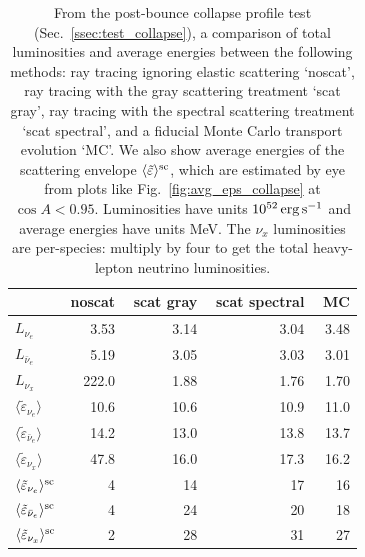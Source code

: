 \documentclass[aps,floatfix,prd,superscriptaddress,twocolumn]{revtex4-1}
\begin{document}
\begin{table}%
  \caption{
    From the post-bounce collapse profile test (Sec.~\ref{ssec:test_collapse}),
    a comparison of total luminosities and average energies between
    the following methods:
    ray tracing ignoring elastic scattering `noscat',
    ray tracing with the gray scattering treatment `scat gray',
    ray tracing with the spectral scattering treatment `scat spectral', and
    a fiducial Monte Carlo transport evolution `MC'.
    We also show average energies of the scattering envelope
    $\langle\tilde{\varepsilon}\rangle^{\rm sc}$, which are estimated by eye
    from plots like Fig.~\ref{fig:avg_eps_collapse} at $\cos A < 0.95$.
    Luminosities have units $10^{52}\,{\rm erg}\,{\rm s}^{-1}$ and
    average energies have units MeV.
    The $\nu_x$ luminosities are per-species:
    multiply by four to get the total heavy-lepton neutrino luminosities.
  }
  \label{tab:collapse_rt_vs_mc}
  \begin{tabularx}{\columnwidth}{X r r r r}
    & {\bf noscat} & \,\,{\bf scat gray} & \,\,{\bf scat spectral} & \,\,{\bf MC} \\
    \hline
    $L_{\nu_e}$                                         &  3.53 & 3.14 & 3.04 & 3.48 \\
    $L_{\bar{\nu}_e}$                                   & 5.19 & 3.05 & 3.03 & 3.01 \\
    $L_{\nu_x}$                                         & 222.0  & 1.88 & 1.76 & 1.70 \\
    $\langle \tilde{\varepsilon}_{\nu_e} \rangle$               &  10.6 & 10.6 & 10.9 & 11.0 \\
    $\langle \tilde{\varepsilon}_{\bar{\nu}_e} \rangle$         & 14.2 & 13.0 & 13.8 & 13.7 \\
    $\langle \tilde{\varepsilon}_{\nu_x} \rangle$               & 47.8 & 16.0 & 17.3 & 16.2 \\
    $\langle \tilde{\varepsilon}_{\nu_e} \rangle^{\rm sc}$      & 4    & 14   & 17   & 16 \\
    $\langle \tilde{\varepsilon}_{\bar{\nu}_e} \rangle^{\rm sc}$& 4    & 24   & 20   & 18 \\
    $\langle \tilde{\varepsilon}_{\nu_x} \rangle^{\rm sc}$      & 2    & 28   & 31   & 27 \\
    \hline
  \end{tabularx}
\end{table}
\end{document}
